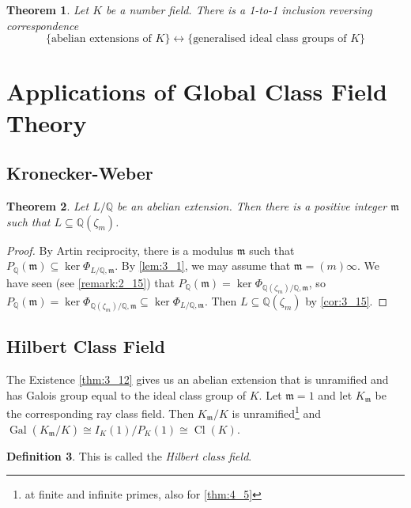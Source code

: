 \documentclass[11pt]{article}
\theoremstyle{definition}
\newtheorem{definition}{Definition}[section]
\theoremstyle{plain}
\newtheorem{theorem}[definition]{Theorem}
\theoremstyle{remark}
\DeclareMathOperator{\Gal}{Gal}
\DeclareMathOperator{\Cl}{Cl}
\newcommand{\QQ}{\mathbb{Q}}
\newcommand{\fm}{\mathfrak{m}}
\begin{document}
\begin{theorem}\label{thm:3_17}
    Let $K$ be a number field. There is a 1-to-1 inclusion reversing correspondence
    \begin{equation*}
        \{\text{abelian extensions of } K\} \longleftrightarrow \{\text{generalised ideal class groups of } K\}
    \end{equation*}
\end{theorem}

\section{Applications of Global Class Field Theory}

\subsection{Kronecker-Weber}

\begin{theorem}\label{thm:4_1}
    Let $L/\QQ$ be an abelian extension. Then there is a positive integer $\fm$ such that $L \subseteq \QQ(\zeta_m)$.
\end{theorem}
\begin{proof}
    By Artin reciprocity, there is a modulus $\fm$ such that $P_\QQ(\fm) \subseteq \ker \Phi_{L/\QQ, \fm}$. By \autoref{lem:3_1}, we may assume that $\fm = (m) \infty$. We have seen (see \autoref{remark:2_15}) that $P_\QQ(\fm) = \ker \Phi_{\QQ(\zeta_m)/\QQ, \fm}$, so $P_\QQ(\fm) = \ker \Phi_{\QQ(\zeta_m)/\QQ, \fm} \subseteq \ker \Phi_{L/\QQ, \fm}$. Then $L \subseteq \QQ(\zeta_m)$ by \autoref{cor:3_15}.
\end{proof}

\subsection{Hilbert Class Field}

The Existence \autoref{thm:3_12} gives us an abelian extension that is unramified and has Galois group equal to the ideal class group of $K$. Let $\fm = 1$ and let $K_\fm$ be the corresponding ray class field. Then $K_\fm / K$ is unramified\footnote{at finite and infinite primes, also for \autoref{thm:4_5}} and $\Gal(K_\fm/K) \cong I_K(1) / P_K(1) \cong \Cl(K)$.


\begin{definition}\label{def:4_3}
    This is called the \emph{Hilbert class field}.
\end{definition}
\end{document}
